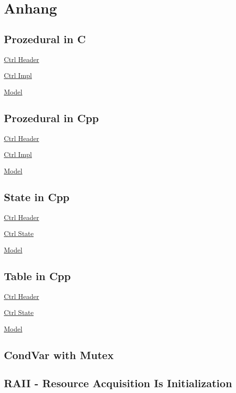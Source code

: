 \newpage
\onecolumn
\section{Anhang}
\subsection{Prozedural in C}
\underline{Ctrl Header}


\noindent\underline{Ctrl Impl}

\noindent\underline{Model}


\subsection{Prozedural in Cpp}
\underline{Ctrl Header}

\noindent\underline{Ctrl Impl}


\underline{Model}


\subsection{State in Cpp}
\underline{Ctrl Header}

\noindent\underline{Ctrl State}

\noindent\underline{Model}


\subsection{Table in Cpp}
\underline{Ctrl Header}

\noindent\underline{Ctrl State}

\noindent\underline{Model}


\subsection{CondVar with Mutex}


\subsection{RAII - Resource Acquisition Is Initialization}

